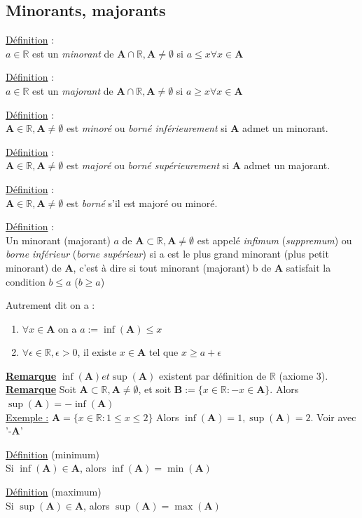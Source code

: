 \documentclass[12pt,a4paper]{article}
\newcommand{\evid}[1]{\textbf{\underline{#1}}}
\newcommand{\A}{\ensuremath{\mathbf{A}}}
\newcommand{\R}{\ensuremath{\mathbb{R}} }
\newcommand{\Definition}{\underline{Définition} }
\begin{document}
\subsection{Minorants, majorants}
\begin{boite}
	\Definition :\\
	$a\in \R$ est un \textit{minorant} de $\A \cap \R, \A\neq \emptyset$ si $a \leq x \forall x \in \A$
\end{boite}
\begin{boite}
	\Definition :\\
	$a\in \R$ est un \textit{majorant} de $\A \cap \R, \A\neq \emptyset$ si $a \geq x \forall x \in \A$
\end{boite}
\begin{boite}
	\Definition :\\
	$\A \in \R, \A \neq \emptyset$ est \textit{minoré} ou \textit{borné  inférieurement} si $\A$ admet un minorant.
\end{boite}
\begin{boite}
	\Definition :\\
	$\A \in \R, \A \neq \emptyset$ est \textit{majoré} ou \textit{borné  supérieurement} si $\A$ admet un majorant.
\end{boite}
\begin{boite}
	\Definition :\\
	$\A \in \R, \A \neq \emptyset$ est \textit{borné} s'il est majoré ou minoré.
\end{boite}
\begin{boite}
	\Definition :\\
	Un minorant (majorant) $a$ de $\A \subset \R, \A \neq \emptyset$ est appelé \textit{infimum} (\textit{suppremum}) ou \textit{borne inférieur} (\textit{borne supérieur}) si a est le plus grand minorant (plus petit minorant) de $\A$, c'est à dire si tout minorant (majorant) b de $\A$ satisfait la condition $b \leq a$ ($b \geq a$)
\end{boite}
Autrement dit on a :
\begin{enumerate}
	\item $\forall x \in \A$ on a $a := \inf(\A) \leq x$
	\item $\forall \epsilon \in \R, \epsilon > 0$, il existe $x \in \A$ tel que $x \geq a+\epsilon$
\end{enumerate}
\evid{Remarque} $\inf(\A) et \sup(\A)$ existent par définition de \R (axiome 3).
\evid{Remarque} Soit $\A \subset \R, \A \neq \emptyset$, et soit $\mathbf{B} :=\{x\in\R : -x \in \A\}$. Alors $\sup(\A) = -\inf(\A)$\\
\underline{Exemple :}  $\A = \{x \in \R :  1\leq x \leq 2\}$ Alors $\inf(\A) = 1, \sup(\A) = 2$. Voir avec '-\A'
\begin{boite}[0.5]
\Definition (minimum)\\
Si $\inf(\A) \in \A$, alors $\inf(\A) = \min(\A)$
\end{boite}
\begin{boite}[0.55]
\Definition (maximum)\\
Si $\sup(\A) \in \A$, alors $\sup(\A) = \max(\A)$
\end{boite}
\end{document}
